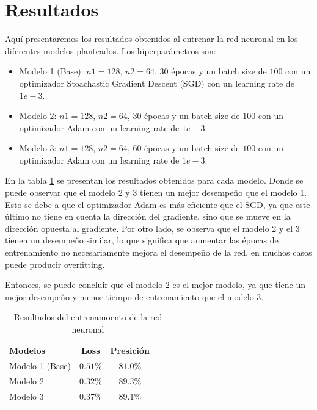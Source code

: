 \documentclass[aps,prl,reprint,groupedaddress]{revtex4-2}
\begin{document}
\section{Resultados}

Aquí presentaremos los resultados obtenidos al entrenar la red neuronal en los 
diferentes modelos planteados. Los hiperparámetros son:

\begin{itemize}
  \item Modelo 1 (Base): $n1=128$, $n2=64$, $30$ épocas y un batch size de $100$ 
  con un optimizador Stoachastic Gradient Descent (SGD) con un learning rate 
  de $1e-3$.
  \item Modelo 2: $n1=128$, $n2=64$, $30$ épocas y un batch size de $100$ con un
  optimizador Adam con un learning rate de $1e-3$.
  \item Modelo 3: $n1=128$, $n2=64$, $60$ épocas y un batch size de $100$ con un
  optimizador Adam con un learning rate de $1e-3$.
\end{itemize}

En la tabla \ref{tab:models} se presentan los resultados obtenidos para cada
modelo. Donde se puede observar que el modelo 2 y 3 tienen un mejor desempeño
que el modelo 1. Esto se debe a que el optimizador Adam es más eficiente que el
SGD, ya que este último no tiene en cuenta la dirección del gradiente, sino que
se mueve en la dirección opuesta al gradiente. Por otro lado, se observa que
el modelo 2 y el 3 tienen un desempeño similar, lo que significa que aumentar 
las épocas de entrenamiento no necesariamente mejora el desempeño de la red, 
en muchos casos puede producir overfitting.

Entonces, se puede concluir que el modelo 2 es el mejor modelo, ya que tiene un
mejor desempeño y menor tiempo de entrenamiento que el modelo 3.

\begin{table}[h!]
  \begin{tabular}{lccll}
    \hline
    Modelos         & Loss      & Presición & \\ \hline
    Modelo 1 (Base) & $0.51\% $ & $81.0\%$  & \\
    Modelo 2        & $0.32\% $ & $89.3\%$  & \\
    Modelo 3        & $0.37\% $ & $89.1\%$  & \\ \hline
  \end{tabular}
  \caption{Resultados del entrenamoento de la red neuronal}
  \label{tab:models}
\end{table}
\end{document}
